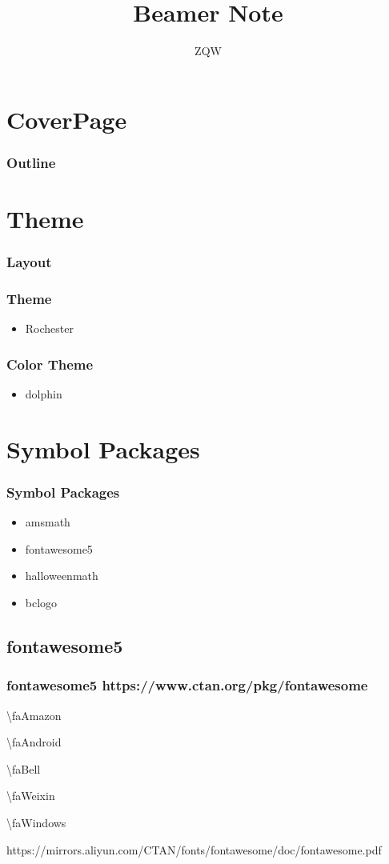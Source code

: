 \documentclass[xetex, mathserif, UTF8]{beamer}
\title{Beamer Note}
\author{ZQW}
\begin{document}
\section{CoverPage}
\frame{\titlepage}

\begin{frame}
  \frametitle{Outline}
  \tableofcontents
\end{frame}

\section{Theme}\label{sec:theme}

\begin{frame}
  \frametitle{Layout}
  \layout
\end{frame}

\begin{frame}
  \frametitle{Theme}
  \begin{itemize}
  \item Rochester
  \end{itemize}
\end{frame}


\begin{frame}
  \frametitle{Color Theme}
  \begin{itemize}
  \item dolphin
  \end{itemize}
\end{frame}


\section{Symbol Packages}\label{sec:sym_pkg}

\begin{frame}
  \frametitle{Symbol Packages}
  \begin{itemize}
  \item amsmath
  \item fontawesome5
  \item halloweenmath
  \item bclogo
  \end{itemize}
\end{frame}


\subsection{fontawesome5}\label{sec:ft5}
\begin{frame}
  \frametitle{fontawesome5 https://www.ctan.org/pkg/fontawesome}
  \faAmazon \quad \textbackslash faAmazon

  \faAndroid \quad \textbackslash faAndroid

  \faBell \quad \textbackslash faBell

  \faWeixin \quad \textbackslash faWeixin

  \faWindows \quad \textbackslash faWindows

  https://mirrors.aliyun.com/CTAN/fonts/fontawesome/doc/fontawesome.pdf
\end{frame}
\end{document}

